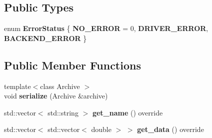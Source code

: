 \subsection*{Public Types}
\begin{DoxyCompactItemize}
\item 
enum {\bfseries Error\+Status} \{ {\bfseries N\+O\+\_\+\+E\+R\+R\+OR} = 0, 
{\bfseries D\+R\+I\+V\+E\+R\+\_\+\+E\+R\+R\+OR}, 
{\bfseries B\+A\+C\+K\+E\+N\+D\+\_\+\+E\+R\+R\+OR}
 \}\hypertarget{structrobot__interfaces_1_1Status_a88f1cb8387648815ca75754985bdb3b6}{}\label{structrobot__interfaces_1_1Status_a88f1cb8387648815ca75754985bdb3b6}

\end{DoxyCompactItemize}
\subsection*{Public Member Functions}
\begin{DoxyCompactItemize}
\item 
{\footnotesize template$<$class Archive $>$ }\\void {\bfseries serialize} (Archive \&archive)\hypertarget{structrobot__interfaces_1_1Status_a5531f83e2ef30f7629548194b4e3e9da}{}\label{structrobot__interfaces_1_1Status_a5531f83e2ef30f7629548194b4e3e9da}

\item 
std\+::vector$<$ std\+::string $>$ {\bfseries get\+\_\+name} () override\hypertarget{structrobot__interfaces_1_1Status_a2cd6543deb86d878ba43153c18d2fadb}{}\label{structrobot__interfaces_1_1Status_a2cd6543deb86d878ba43153c18d2fadb}

\item 
std\+::vector$<$ std\+::vector$<$ double $>$ $>$ {\bfseries get\+\_\+data} () override\hypertarget{structrobot__interfaces_1_1Status_af530134f33fa21c02d1157636c385fa3}{}\label{structrobot__interfaces_1_1Status_af530134f33fa21c02d1157636c385fa3}

\end{DoxyCompactItemize}
